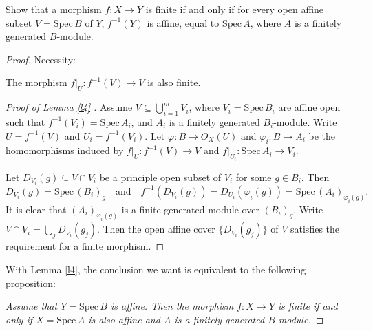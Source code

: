 \begin{exe}
	\label{2.3.4}
	Show that a morphism $f:X\rightarrow Y$ is finite if and only if for every open affine subset $V=\mathrm{Spec}\,B$
	of $Y$, $f^{-1}(Y)$ is affine, equal to $\mathrm{Spec}\,A$, where $A$ is a finitely generated $B$-module.
\end{exe}

\begin{proof}
	Necessity:\begin{lm}
		\label{l4}
		The morphism $f|_U:f^{-1}(V)\to V$ is also finite.
	\end{lm}
	\begin{proof}[Proof of Lemma \ref*{l4} ]
		Assume $V\subseteq\bigcup_{i=1}^mV_i$, where $V_i=\mathrm{Spec}\,B_i$ are affine open such that $f^{-1}(V_i)=\mathrm{Spec}\,A_i$, and $A_i$ is a finitely generated $B_i$-module. Write $U=f^{-1}(V)$ and $U_i=f^{-1}(V_i)$. Let $\varphi: B\rightarrow O_X(U)$ and $\varphi_i: B\rightarrow A_i$ be the homomorphisms induced by $f|_U: f^{-1}(V) \rightarrow V$ and $f|_{U_i}: \mathrm{Spec}\,A_i \rightarrow V_i$.
		
		Let $D_{V_i}(g)\subseteq V\cap V_i$ be a principle open subset of $V_i$ for some $g\in B_i$. Then $$D_{V_i}(g)=\mathrm{Spec}\,(B_i)_g\quad\text{and}\quad f^{-1}(D_{V_i}(g))=D_{U_i}(\varphi_i(g))=\mathrm{Spec}\,(A_i)_{\varphi_i(g)}.$$ It is clear that $(A_i)_{\varphi_i(g)}$ is a finite generated module over $(B_i)_g$. Write $V\cap V_i=\bigcup_j D_{V_i}(g_j)$. Then the open affine cover $\{D_{V_i}(g_j)\}$ of $V$ satisfies the requirement for a finite morphism.
	\end{proof}
	With Lemma \ref{l4}, the conclusion we want is equivalent to the following proposition:
	
	\emph{Assume that $Y=\mathrm{Spec}\,B$ is affine. Then the morphism $f:X\to Y$ is finite if and only if $X=\mathrm{Spec}\,A$ is also affine and $A$ is a finitely generated $B$-module.}
	

\end{proof}

